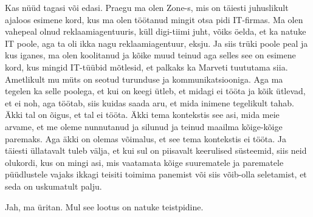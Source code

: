 
Kas nüüd tagasi või edasi. Praegu ma olen Zone-s, mis on täiesti juhuslikult ajaloos esimene kord, kus ma olen töötanud mingit otsa pidi IT-firmas. Ma olen vahepeal olnud reklaamiagentuuris, küll digi-tiimi juht, võiks öelda, et ka natuke IT poole, aga ta oli ikka nagu reklaamiagentuur, eksju. Ja siis trüki poole peal ja kus iganes, ma olen koolitanud ja kõike muud teinud aga selles see on esimene kord, kus mingid IT-tüübid mõtlesid, et palkaks ka Marveti tuututama siia. Ametlikult mu  müts on seotud turunduse ja kommunikatsiooniga. Aga ma tegelen ka selle poolega, et kui on  keegi ütleb, et midagi ei tööta ja kõik ütlevad, et ei noh, aga töötab, siis kuidas saada aru, et mida inimene tegelikult tahab. Äkki tal on õigus, et tal ei tööta. Äkki tema kontekstis see asi, mida meie arvame, et me oleme nunnutanud ja silunud ja teinud maailma kõige-kõige paremaks. Aga äkki on olemas võimalus, et see tema kontekstis ei tööta. Ja täiesti üllatavalt tuleb välja, et kui sul on piisavalt keerulised süsteemid, siis  neid olukordi, kus on mingi asi, mis vaatamata kõige suurematele ja parematele püüdlustele vajaks ikkagi teisiti toimima panemist või siis võib-olla seletamist,  et seda on uskumatult palju. 


Jah, ma üritan. Mul see lootus on natuke teistpidine. 

